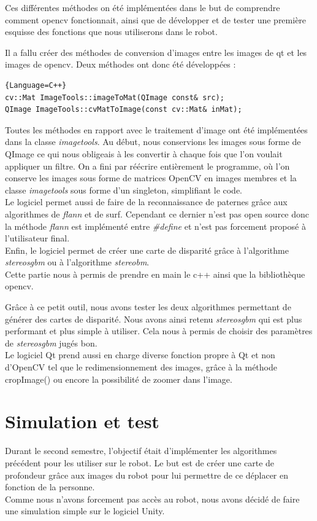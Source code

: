 \documentclass[12pt,a4paper]{report}
\begin{document}
Ces différentes méthodes on été implémentées dans le but de comprendre comment opencv fonctionnait, ainsi que de développer et de tester une première esquisse des fonctions que nous utiliserons dans le robot.

Il a fallu créer des méthodes de conversion d'images entre les images de qt et les images de opencv. Deux méthodes ont donc été développées : 

\begin{lstlisting}{Language=C++}
cv::Mat ImageTools::imageToMat(QImage const& src);
QImage ImageTools::cvMatToImage(const cv::Mat& inMat);
\end{lstlisting}

Toutes les méthodes en rapport avec le traitement d'image ont été implémentées dans la classe \textit{imagetools}. Au début, nous conservions les images sous forme de QImage ce qui nous obligeais à les convertir à chaque fois que l'on voulait appliquer un filtre. On a fini par réécrire entièrement le programme, où l'on conserve les images sous forme de matrices OpenCV en images membres et la classe \textit{imagetools} sous forme d'un singleton, simplifiant le code.\\
Le logiciel permet aussi de faire de la reconnaissance de paternes grâce aux algorithmes de \textit{flann} et de surf. Cependant ce dernier n'est pas open source donc la méthode \textit{flann} est implémenté entre \textit{\#define} et n'est pas forcement proposé à l'utilisateur final.\\
Enfin, le logiciel permet de créer une carte de disparité grâce à l'algorithme \textit{stereosgbm} ou à l'algorithme \textit{stereobm}.\\

Cette partie nous à permis de prendre en main le c++ ainsi que la bibliothèque opencv. 

Grâce à ce petit outil, nous avons tester les deux algorithmes permettant de générer des cartes de disparité. Nous avons ainsi retenu \textit{stereosgbm} qui est plus performant et plus simple à utiliser. Cela nous à permis de choisir des paramètres de \textit{stereosgbm} jugés bon.\\

Le logiciel Qt prend aussi en charge diverse fonction propre à Qt et non d'OpenCV tel que le redimensionnement des images, grâce à la méthode cropImage() ou encore la possibilité de zoomer dans l'image.

\section{Simulation et test}
Durant le second semestre, l'objectif était d'implémenter les algorithmes précédent pour les utiliser sur le robot. Le but est de créer une carte de profondeur grâce aux images du robot pour lui permettre de ce déplacer en fonction de la personne.\\
Comme nous n'avons forcement pas accès au robot, nous avons décidé de faire une simulation simple sur le logiciel Unity.\\
\end{document}
